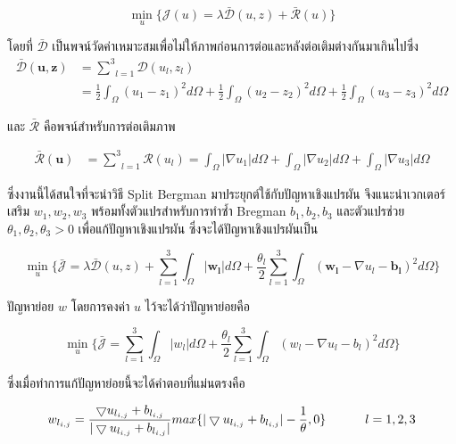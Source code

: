 \documentclass[hidelinks,a4paper,14pt]{article}
\numberwithin{equation}{section}							%
\begin{document}
{$$\min_{u} \{ \mathcal{J}(u)= \lambda \mathcal{\bar{D}}(u,z)+  \mathcal{\bar{R}}(u) \}$$

โดยที่ $\mathcal{\bar{D}}$ เป็นพจน์วัดค่าเหมาะสมเพื่อไม่ให้ภาพก่อนการต่อและหลังต่อเติมต่างกันมาเกินไปซึ่ง
\begin{align*}
\mathcal{\bar{D}}(\boldsymbol{u},\boldsymbol{z})  &= \underset{l=1}{\overset{3}{\sum}}\mathcal{D}(u_l,z_l) \\
&= \frac{1}{2}\int_{\Omega}^{}(u_1 - z_1)^2 d\Omega + \frac{1}{2}\int_{\Omega}^{}(u_2 - z_2)^2 d\Omega + \frac{1}{2}\int_{\Omega}^{}(u_3 - z_3)^2 d\Omega
\end{align*}

และ $ \mathcal{\bar{R}} $ คือพจน์สำหรับการต่อเติมภาพ 

\begin{align*}
\mathcal{\bar{R}}(\boldsymbol{u}) &= \underset{l=1}{\overset{3}{\sum}}\mathcal{R}(u_l) = \int_{\Omega}^{}\lvert\nabla u_1 \rvert d\Omega + \int_{\Omega}^{}\lvert\nabla u_2 \rvert d\Omega + \int_{\Omega}^{}\lvert\nabla u_3 \rvert d\Omega
\end{align*}

ซึ่งงานนี้ได้สนใจที่จะนำวิธี Split Bergman มาประยุกต์ใช้กับปัญหาเชิงแปรผัน จึงแนะนำเวกเตอร์เสริม $w_1, w_2, w_3$ พร้อมทั้งตัวแปรสำหรับการทำซ้ำ Bregman $b_1, b_2, b_3$ และตัวแปรช่วย $\theta_1, \theta_2, \theta_3 > 0 $ เพื่อแก้ปัญหาเชิงแปรผัน ซึ่งจะได้ปัญหาเชิงแปรผันเป็น

$$ 
\min_{u} \{\bar{\mathcal{J}}= \lambda \mathcal{\bar{D}}(u,z) +  \underset{l=1}{\overset{3}{\sum}} \int_{\Omega}^{}|\boldsymbol{w_l}|d\Omega
+ \frac{\theta_l}{2} \underset{l=1}{\overset{3}{\sum}}\int_{\Omega}^{}(\boldsymbol{w_l} - \nabla u_l - \boldsymbol{b_l})^{2}d\Omega\}
$$



ปัญหาย่อย $w$ โดยการคงค่า $u$ ไว้จะได้ว่าปัญหาย่อยคือ

$$ 
\min_{u} \{\bar{\mathcal{J}}= \underset{l=1}{\overset{3}{\sum}} \int_{\Omega}^{}|{w_l}|d\Omega
+ \frac{\theta_l}{2} \underset{l=1}{\overset{3}{\sum}}\int_{\Omega}^{}({w_l} - \nabla u_l - {b_l})^{2}d\Omega\}
$$

ซึ่งเมื่อทำการแก้ปัญหาย่อยนี้จะได้คำตอบที่แม่นตรงคือ

$$ w_{l_{i,j}} = \frac{\bigtriangledown u_{l_{i,j}}  + b_{l_{i,j}} }{ | \bigtriangledown u_{l_{i,j}}  + b_{l_{i,j}} | } max \{  | \bigtriangledown u_{l_{i,j}}  + b_{l_{i,j}} | - \frac{1}{\theta} , 0\} \hspace{1cm}  \hspace{0.1cm} l = 1,2,3$$ 


}
\end{document}
